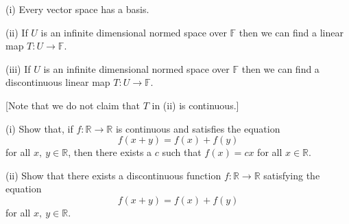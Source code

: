 \begin{lemma}\label{Hamel} 
(i) Every vector space
has a basis.

(ii) If $U$ is an infinite dimensional normed space
over ${\mathbb F}$ then we can find a
linear map $T:U\rightarrow{\mathbb F}$.

(iii) If $U$ is an infinite dimensional normed space
over ${\mathbb F}$ then we can find a
discontinuous linear map $T:U\rightarrow{\mathbb F}$.
\end{lemma}
[Note that we do not claim that $T$ in (ii) is continuous.]
\begin{exercise} (i) Show that, if 
$f:{\mathbb R}\rightarrow{\mathbb R}$ is continuous
and satisfies the equation
\[f(x+y)=f(x)+f(y)\]
for all $x,\ y\in{\mathbb R}$, then there exists a $c$
such that $f(x)=cx$ for all $x\in{\mathbb R}$.

(ii) Show that there exists a discontinuous function
$f:{\mathbb R}\rightarrow{\mathbb R}$
satisfying the equation
\[f(x+y)=f(x)+f(y)\]
for all $x,\ y\in{\mathbb R}$.

\end{exercise}


